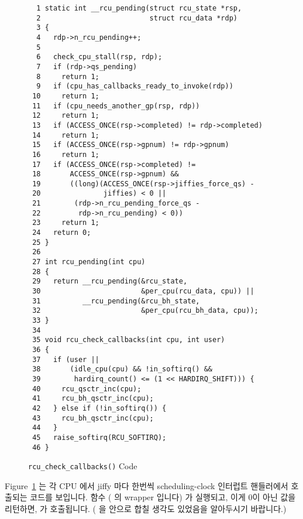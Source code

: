 \begin{figure}[tbp]
{ \scriptsize
\begin{verbatim}
  1 static int __rcu_pending(struct rcu_state *rsp,
  2                          struct rcu_data *rdp)
  3 {
  4   rdp->n_rcu_pending++;
  5
  6   check_cpu_stall(rsp, rdp);
  7   if (rdp->qs_pending)
  8     return 1;
  9   if (cpu_has_callbacks_ready_to_invoke(rdp))
 10     return 1;
 11   if (cpu_needs_another_gp(rsp, rdp))
 12     return 1;
 13   if (ACCESS_ONCE(rsp->completed) != rdp->completed)
 14     return 1;
 15   if (ACCESS_ONCE(rsp->gpnum) != rdp->gpnum)
 16     return 1;
 17   if (ACCESS_ONCE(rsp->completed) !=
 18       ACCESS_ONCE(rsp->gpnum) &&
 19       ((long)(ACCESS_ONCE(rsp->jiffies_force_qs) -
 20               jiffies) < 0 ||
 21        (rdp->n_rcu_pending_force_qs -
 22         rdp->n_rcu_pending) < 0))
 23     return 1;
 24   return 0;
 25 }
 26
 27 int rcu_pending(int cpu)
 28 {
 29   return __rcu_pending(&rcu_state,
 30                        &per_cpu(rcu_data, cpu)) ||
 31          __rcu_pending(&rcu_bh_state,
 32                        &per_cpu(rcu_bh_data, cpu));
 33 }
 34
 35 void rcu_check_callbacks(int cpu, int user)
 36 {
 37   if (user ||
 38       (idle_cpu(cpu) && !in_softirq() &&
 39        hardirq_count() <= (1 << HARDIRQ_SHIFT))) {
 40     rcu_qsctr_inc(cpu);
 41     rcu_bh_qsctr_inc(cpu);
 42   } else if (!in_softirq()) {
 43     rcu_bh_qsctr_inc(cpu);
 44   }
 45   raise_softirq(RCU_SOFTIRQ);
 46 }
\end{verbatim}
}
\caption{{\tt rcu\_check\_callbacks()} Code}
\label{fig:app:rcuimpl:rcutreewt:Code for rcutree rcu-check-callbacks}
\end{figure}

Figure~\ref{fig:app:rcuimpl:rcutreewt:Code for rcutree rcu-check-callbacks}
는 각 CPU 에서 jiffy 마다 한번씩 scheduling-clock 인터럽트 핸들러에서 호출되는
코드를 보입니다.
 함수 ( 의 wrapper 입니다) 가 실행되고,
이게 0이 아닌 값을 리턴하면,  가 호출됩니다.
( 을  안으로 합칠 생각도 있었음을
알아두시기 바랍니다.)
\iffalse

Figure~\ref{fig:app:rcuimpl:rcutreewt:Code for rcutree rcu-check-callbacks}
shows the code that is called from the scheduling-clock interrupt
handler once per jiffy from each CPU.
The \co{rcu_pending()} function (which is a wrapper for \co{__rcu_pending()})
is invoked, and if it returns non-zero, then \co{rcu_check_callbacks()}
is invoked.
(Note that there is some thought being given to merging \co{rcu_pending()}
into \co{rcu_check_callbacks()}.)
\fi


